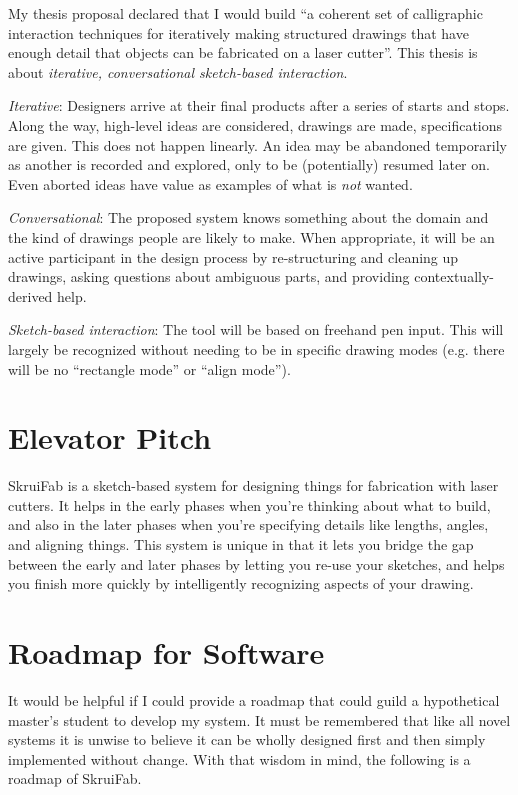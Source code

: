 \documentclass[12pt]{article}
\begin{document}
My thesis proposal declared that I would build ``a coherent set of
calligraphic interaction techniques for iteratively making structured
drawings that have enough detail that objects can be fabricated on a
laser cutter''. This thesis is about \textit{iterative, conversational
  sketch-based interaction}.

\textit{Iterative}: Designers arrive at their final products after a
series of starts and stops. Along the way, high-level ideas are
considered, drawings are made, specifications are given. This does not
happen linearly. An idea may be abandoned temporarily as another is
recorded and explored, only to be (potentially) resumed later on. Even
aborted ideas have value as examples of what is \textit{not}
wanted.

\textit{Conversational}: The proposed system knows something about the
domain and the kind of drawings people are likely to make. When
appropriate, it will be an active participant in the design process by
re-structuring and cleaning up drawings, asking questions about
ambiguous parts, and providing contextually-derived help.

\textit{Sketch-based interaction}: The tool will be based on freehand
pen input. This will largely be recognized without needing to be in
specific drawing modes (e.g. there will be no ``rectangle mode'' or
``align mode''). 

\section{Elevator Pitch}

SkruiFab is a sketch-based system for designing things for fabrication
with laser cutters. It helps in the early phases when you're thinking
about what to build, and also in the later phases when you're
specifying details like lengths, angles, and aligning things. This
system is unique in that it lets you bridge the gap between the early
and later phases by letting you re-use your sketches, and helps you
finish more quickly by intelligently recognizing aspects of your
drawing.

\section{Roadmap for Software}

It would be helpful if I could provide a roadmap that could guild a
hypothetical master's student to develop my system. It must be
remembered that like all novel systems it is unwise to believe it can
be wholly designed first and then simply implemented without
change. With that wisdom in mind, the following is a roadmap of
SkruiFab.
\end{document}
